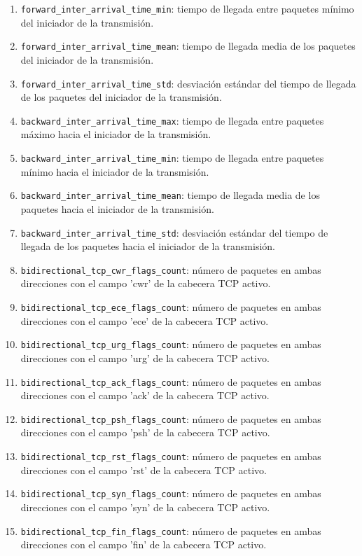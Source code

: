 \begin{enumerate}
  \item \texttt{forward\_inter\_arrival\_time\_min}: tiempo de llegada entre paquetes mínimo del iniciador de la transmisión.
  \item \texttt{forward\_inter\_arrival\_time\_mean}: tiempo de llegada media de los paquetes del iniciador de la transmisión.
  \item \texttt{forward\_inter\_arrival\_time\_std}: desviación estándar del tiempo de llegada de los paquetes del iniciador de la transmisión.
  \item \texttt{backward\_inter\_arrival\_time\_max}: tiempo de llegada entre paquetes máximo hacia el iniciador de la transmisión.
  \item \texttt{backward\_inter\_arrival\_time\_min}: tiempo de llegada entre paquetes mínimo hacia el iniciador de la transmisión.
  \item \texttt{backward\_inter\_arrival\_time\_mean}: tiempo de llegada media de los paquetes hacia el iniciador de la transmisión.
  \item \texttt{backward\_inter\_arrival\_time\_std}: desviación estándar del tiempo de llegada de los paquetes hacia el iniciador de la transmisión.
  \item \texttt{bidirectional\_tcp\_cwr\_flags\_count}: número de paquetes en ambas direcciones con el campo 'cwr' de la cabecera TCP activo.
  \item \texttt{bidirectional\_tcp\_ece\_flags\_count}: número de paquetes en ambas direcciones con el campo 'ece' de la cabecera TCP activo.
  \item \texttt{bidirectional\_tcp\_urg\_flags\_count}: número de paquetes en ambas direcciones con el campo 'urg' de la cabecera TCP activo.
  \item \texttt{bidirectional\_tcp\_ack\_flags\_count}: número de paquetes en ambas direcciones con el campo 'ack' de la cabecera TCP activo.
  \item \texttt{bidirectional\_tcp\_psh\_flags\_count}: número de paquetes en ambas direcciones con el campo 'psh' de la cabecera TCP activo.
  \item \texttt{bidirectional\_tcp\_rst\_flags\_count}: número de paquetes en ambas direcciones con el campo 'rst' de la cabecera TCP activo.
  \item \texttt{bidirectional\_tcp\_syn\_flags\_count}: número de paquetes en ambas direcciones con el campo 'syn' de la cabecera TCP activo.
  \item \texttt{bidirectional\_tcp\_fin\_flags\_count}: número de paquetes en ambas direcciones con el campo 'fin' de la cabecera TCP activo.

\end{enumerate}
